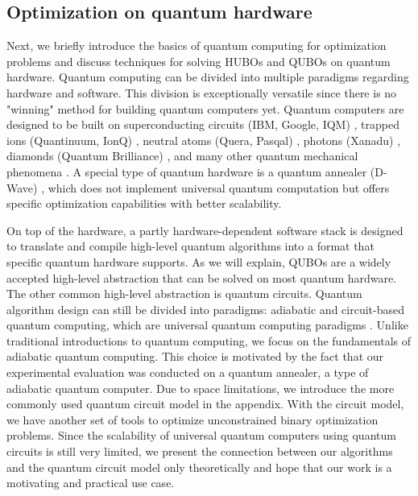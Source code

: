 \subsection{Optimization on quantum hardware}

Next, we briefly introduce the basics of quantum computing for optimization problems and discuss techniques for solving HUBOs and QUBOs on quantum hardware. Quantum computing can be divided into multiple paradigms regarding hardware and software. This division is exceptionally versatile since there is no "winning" method for building quantum computers yet. Quantum computers are designed to be built on superconducting circuits (IBM, Google, IQM) \cite{Wendin_2017}, trapped ions (Quantinuum, IonQ) \cite{paul1990electromagnetic}, neutral atoms (Quera, Pasqal) \cite{GRIMM200095}, photons (Xanadu) \cite{knill2001scheme}, diamonds (Quantum Brilliance) \cite{neumann2008multipartite}, and many other quantum mechanical phenomena \cite{https://doi.org/10.1002/spe.3039}. A special type of quantum hardware is a quantum annealer (D-Wave) \cite{APOLLONI1989233, PhysRevE.58.5355}, which does not implement universal quantum computation but offers specific optimization capabilities with better scalability.

On top of the hardware, a partly hardware-dependent software stack is designed to translate and compile high-level quantum algorithms into a format that specific quantum hardware supports. As we will explain, QUBOs are a widely accepted high-level abstraction that can be solved on most quantum hardware. The other common high-level abstraction is quantum circuits. Quantum algorithm design can still be divided into paradigms: adiabatic and circuit-based quantum computing, which are universal quantum computing paradigms \cite{Aharonov_van_Dam_Kempe_Landau_Lloyd_Regev_2004}. Unlike traditional introductions to quantum computing, we focus on the fundamentals of adiabatic quantum computing. This choice is motivated by the fact that our experimental evaluation was conducted on a quantum annealer, a type of adiabatic quantum computer. Due to space limitations, we introduce the more commonly used quantum circuit model in the appendix. With the circuit model, we have another set of tools to optimize unconstrained binary optimization problems. Since the scalability of universal quantum computers using quantum circuits is still very limited, we present the connection between our algorithms and the quantum circuit model only theoretically and hope that our work is a motivating and practical use case.

